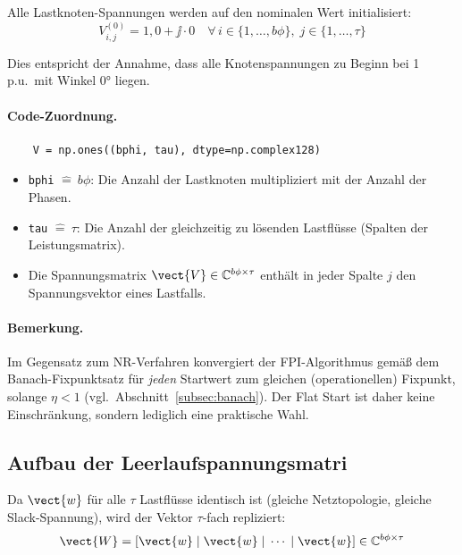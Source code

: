 Alle Lastknoten-Spannungen werden auf den nominalen Wert initialisiert:
\begin{equation}
	V_{i,j}^{(0)} = 1{,}0 + \jj \cdot 0 \quad \forall\, i \in \{1, \ldots, b\phi\},\; j \in \{1, \ldots, \tau\}
	\label{eq:flat_start}
\end{equation}

Dies entspricht der Annahme, dass alle Knotenspannungen zu Beginn bei 1\,p.u.\ mit Winkel $0°$ liegen.

\paragraph{Code-Zuordnung.}
\begin{verbatim}
	V = np.ones((bphi, tau), dtype=np.complex128)
\end{verbatim}

\begin{itemize}
	\item \texttt{bphi} $\hat{=}\ b\phi$: Die Anzahl der Lastknoten multipliziert mit der Anzahl der Phasen.
	\item \texttt{tau} $\hat{=}\ \tau$: Die Anzahl der gleichzeitig zu lösenden Lastflüsse (Spalten der Leistungsmatrix).
	\item Die Spannungsmatrix $\vect{V} \in \mathbb{C}^{b\phi \times \tau}$ enthält in jeder Spalte $j$ den Spannungsvektor eines Lastfalls.
\end{itemize}

\paragraph{Bemerkung.} Im Gegensatz zum NR-Verfahren konvergiert der FPI-Algorithmus gemäß dem Banach-Fixpunktsatz für \textit{jeden} Startwert zum gleichen (operationellen) Fixpunkt, solange $\eta < 1$ (vgl.\ Abschnitt~\ref{subsec:banach}). Der Flat Start ist daher keine Einschränkung, sondern lediglich eine praktische Wahl.

\subsection{Aufbau der Leerlaufspannungsmatri}
\label{subsec:W_matrix}

Da $\vect{w}$ für alle $\tau$ Lastflüsse identisch ist (gleiche Netztopologie, gleiche Slack-Spannung), wird der Vektor $\tau$-fach repliziert:
\begin{equation}
	\vect{W} = [\vect{w} \;|\; \vect{w} \;|\; \cdots \;|\; \vect{w}] \in \mathbb{C}^{b\phi \times \tau}
	\label{eq:W_matrix}
\end{equation}


